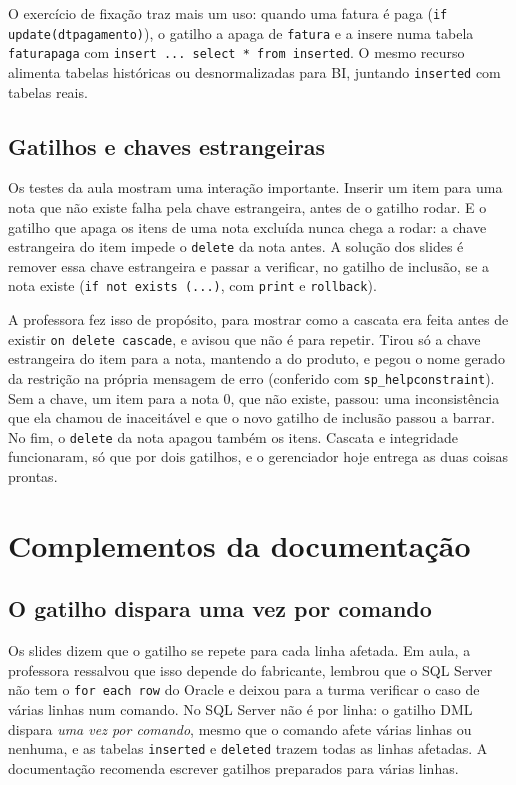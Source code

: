 O exercício de fixação traz mais um uso: quando uma fatura é paga
(\texttt{if update(dtpagamento)}), o gatilho a apaga de \texttt{fatura}
e a insere numa tabela \texttt{faturapaga} com \texttt{insert ...
select * from inserted}. O mesmo recurso alimenta tabelas históricas ou
desnormalizadas para BI, juntando \texttt{inserted} com tabelas reais.

\subsection{Gatilhos e chaves estrangeiras}

Os testes da aula mostram uma interação importante. Inserir um item
para uma nota que não existe falha pela chave estrangeira, antes de o
gatilho rodar. E o gatilho que apaga os itens de uma nota excluída nunca
chega a rodar: a chave estrangeira do item impede o \texttt{delete} da
nota antes. A solução dos slides é remover essa chave estrangeira e
passar a verificar, no gatilho de inclusão, se a nota existe
(\texttt{if not exists (...)}, com \texttt{print} e
\texttt{rollback}).

A professora fez isso de propósito, para mostrar como a cascata era
feita antes de existir \texttt{on delete cascade}, e avisou que não é
para repetir. Tirou só a chave estrangeira do item para a nota, mantendo
a do produto, e pegou o nome gerado da restrição na própria mensagem de
erro (conferido com \texttt{sp\_helpconstraint}). Sem a chave, um item
para a nota 0, que não existe, passou: uma inconsistência que ela chamou
de inaceitável e que o novo gatilho de inclusão passou a barrar. No fim,
o \texttt{delete} da nota apagou também os itens. Cascata e integridade
funcionaram, só que por dois gatilhos, e o gerenciador hoje entrega as
duas coisas prontas.

\section*{Complementos da documentação}

\subsection*{O gatilho dispara uma vez por comando}

Os slides dizem que o gatilho se repete para cada linha afetada. Em
aula, a professora ressalvou que isso depende do fabricante, lembrou que
o SQL Server não tem o \texttt{for each row} do Oracle e deixou para a
turma verificar o caso de várias linhas num comando. No SQL Server não é
por linha: o gatilho DML dispara \emph{uma vez por comando},
mesmo que o comando afete várias linhas ou nenhuma, e as tabelas
\texttt{inserted} e \texttt{deleted} trazem todas as linhas
afetadas. A documentação recomenda escrever
gatilhos preparados para várias linhas.

